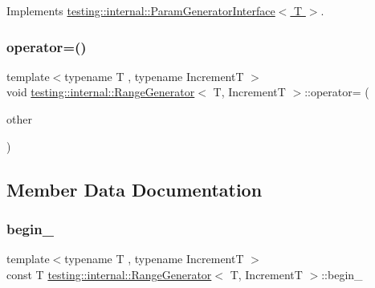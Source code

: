 Implements \hyperlink{classtesting_1_1internal_1_1ParamGeneratorInterface_afa7211b74990e11d3fc7ad4e7113da4f}{testing\+::internal\+::\+Param\+Generator\+Interface$<$ T $>$}.

\mbox{\label{classtesting_1_1internal_1_1RangeGenerator_a00ef0f268e44d48d129a52bf0f9f9539}} 
\subsubsection{\texorpdfstring{operator=()}{operator=()}}
{\footnotesize\ttfamily template$<$typename T , typename IncrementT $>$ \\
void \hyperlink{classtesting_1_1internal_1_1RangeGenerator}{testing\+::internal\+::\+Range\+Generator}$<$ T, IncrementT $>$\+::operator= (\begin{DoxyParamCaption}\item[{const \hyperlink{classtesting_1_1internal_1_1RangeGenerator}{Range\+Generator}$<$ T, IncrementT $>$ \&}]{other }\end{DoxyParamCaption})\hspace{0.3cm}{\ttfamily [private]}}



\subsection{Member Data Documentation}
\mbox{\label{classtesting_1_1internal_1_1RangeGenerator_af16307fd21766bcbb973d8b3335f1a3f}} 
\subsubsection{\texorpdfstring{begin\+\_\+}{begin\_}}
{\footnotesize\ttfamily template$<$typename T , typename IncrementT $>$ \\
const T \hyperlink{classtesting_1_1internal_1_1RangeGenerator}{testing\+::internal\+::\+Range\+Generator}$<$ T, IncrementT $>$\+::begin\+\_\+\hspace{0.3cm}{\ttfamily [private]}}

